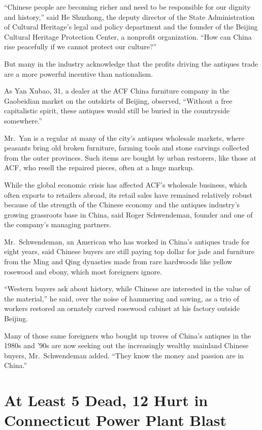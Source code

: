 ﻿\documentclass[12pt]{article}
\begin{document}
``Chinese people are becoming richer and need to be responsible for our dignity and history,'' said
He Shuzhong, the deputy director of the State Administration of Cultural Heritage's legal and policy
department and the founder of the Beijing Cultural Heritage Protection Center, a nonprofit
organization. ``How can China rise peacefully if we cannot protect our culture?''

But many in the industry acknowledge that the profits driving the antiques trade are a more powerful
incentive than nationalism.

As Yan Xubao, 31, a dealer at the ACF China furniture company in the Gaobeidian market on the
outskirts of Beijing, observed, ``Without a free capitalistic spirit, these antiques would still be
buried in the countryside somewhere.''

Mr.~Yan is a regular at many of the city's antiques wholesale markets, where peasants bring old
broken furniture, farming tools and stone carvings collected from the outer provinces. Such items
are bought by urban restorers, like those at ACF, who resell the repaired pieces, often at a huge
markup.

While the global economic crisis has affected ACF's wholesale business, which often exports to
retailers abroad, its retail sales have remained relatively robust because of the strength of the
Chinese economy and the antiques industry's growing grassroots base in China, said Roger
Schwendeman, founder and one of the company's managing partners.

Mr.~Schwendeman, an American who has worked in China's antiques trade for eight years, said Chinese
buyers are still paying top dollar for jade and furniture from the Ming and Qing dynasties made from
rare hardwoods like yellow rosewood and ebony, which most foreigners ignore.

``Western buyers ask about history, while Chinese are interested in the value of the material,'' he
said, over the noise of hammering and sawing, as a trio of workers restored an ornately carved
rosewood cabinet at his factory outside Beijing.

Many of those same foreigners who bought up troves of China's antiques in the 1980s and '90s are now
seeking out the increasingly wealthy mainland Chinese buyers, Mr.~Schwendeman added. ``They know the
money and passion are in China.''

\section{At Least 5 Dead, 12 Hurt in Connecticut Power Plant Blast}
\end{document}
